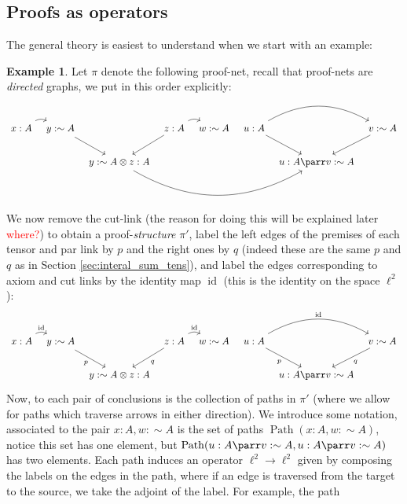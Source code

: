 \documentclass[12pt]{article}
\theoremstyle{plain}
\theoremstyle{definition}
\newtheorem{example}[thm]{Example}
\newcommand{\lto}{\longrightarrow}
\newcommand{\negation}{\sim}
\begin{document}
\subsection{Proofs as operators}
The general theory is easiest to understand when we start with an example:
\begin{example}
Let $\pi$ denote the following proof-net, recall that proof-nets are \emph{directed} graphs, we put in this order explicitly:
\begin{equation}\label{eq:standard_example}
\begin{tikzcd}[column sep = tiny]
{x: A}\arrow[r,bend left] & {y: \negation A}\arrow[dr] & & {z:A}\arrow[dl]\arrow[r,bend left] & {w:\negation A} & {u: A}\arrow[rr,bend left]\arrow[dr] & & {v: \negation A}\arrow[dl]\\
& & {y:\negation A \otimes z: A}\arrow[rrrr, bend right] & & & & {u:A \parr v: \negation A}
\end{tikzcd}
\end{equation}
We now remove the cut-link (the reason for doing this will be explained later \textcolor{red}{where?}) to obtain a proof-\emph{structure} $\pi'$, label the left edges of the premises of each tensor and par link by $p$ and the right ones by $q$ (indeed these are the same $p$ and $q$ as in Section \ref{sec:interal_sum_tens}), and label the edges corresponding to axiom and cut links by the identity map $\operatorname{id}$ (this is the identity on the space $\ell^2$):
\begin{equation}
\begin{tikzcd}[column sep = tiny]
{x: A}\arrow[r,bend left, "{\operatorname{id}}"] & {y: \negation A}\arrow[dr,swap, "p"] & & {z:A}\arrow[dl,"q"]\arrow[r,bend left, "{\operatorname{id}}"] & {w:\negation A} & {u: A}\arrow[rr,bend left, "{\operatorname{id}}"]\arrow[dr,swap,"p"] & & {v: \negation A}\arrow[dl,"q"]\\
& & {y:\negation A \otimes z: A} & & & & {u:A \parr v: \negation A}
\end{tikzcd}
\end{equation}
Now, to each pair of conclusions is the collection of paths in $\pi'$ (where we allow for paths which traverse arrows in either direction). We introduce some notation, associated to the pair $x:A, w:\negation A$ is the set of paths $\operatorname{Path}(x:A,w:\negation A)$, notice this set has one element, but $\operatorname{Path}(u:A \parr v: \negation A,u:A \parr v: \negation A)$ has two elements. Each path induces an operator $\ell^2 \lto \ell^2$ given by composing the labels on the edges in the path, where if an edge is traversed from the target to the source, we take the adjoint of the label. For example, the path

\end{example}
\end{document}
